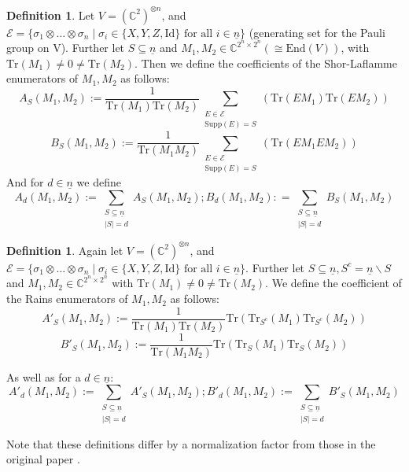 \documentclass[12pt,a4paper,BCOR15mm,twoside,DIV12]{article}
\def\C{\mathbb{C}}
\def\supp{\text{Supp}}
\def\n{\underline{n}}
\def\fa{\text{ for all }}
\def\Tr{\text{Tr}}
\def\Id{\text{Id}}
\theoremstyle{definition}
\newtheorem{defn}[Satz]{Definition}
\begin{document}
\begin{defn}\label{shorLaflamme}
Let $V = (\C^2)^{\otimes n}$, and $\mathcal{E} = \{ \sigma_1 \otimes \ldots \otimes \sigma_n \mid \sigma_i \in \{X,Y,Z,\Id \} \fa i \in \underline{n} \}$ (generating set for the Pauli group on V). Further let $S \subseteq \underline{n}$ and $M_1, M_2 \in \C^{2^n \times 2^n} (\cong \text{End}(V))$, with $\Tr(M_1) \neq 0 \neq \Tr(M_2)$.
Then we define the coefficients of the Shor-Laflamme enumerators \cite{shor-Laflamme} of $M_1, M_2$ as follows:
\begin{equation} A_S(M_1,M_2) := \frac{1}{\Tr(M_1)\Tr(M_2)}\sum_{\substack{E \in \mathcal{E} \\ \supp(E) = S}}(\Tr(E M_1)\Tr(E M_2)) \end{equation}
\begin{equation} B_S(M_1,M_2) := \frac{1}{\Tr(M_1 M_2)} \sum_{\substack{E \in \mathcal{E} \\ \supp(E) = S}}(\Tr(E M_1 E M_2)) \end{equation}
And for $d \in \underline{n}$ we define
\begin{equation} A_d(M_1,M_2) := \sum_{\substack{ S \subseteq \underline{n} \\ |S| = d}} A_S(M_1,M_2) ; B_d(M_1,M_2): = \sum_{\substack{ S \subseteq \underline{n} \\ |S| = d}} B_S(M_1,M_2) \end{equation}
\end{defn}


\begin{defn}\label{rains}
Again let $V = (\C^2)^{\otimes n}$, and $\mathcal{E} = \{ \sigma_1 \otimes \ldots \otimes \sigma_n \mid \sigma_i \in \{X,Y,Z,\Id \} \fa i \in \underline{n} \}$. Further let $S \subseteq \underline{n}, S^c = \n \backslash S$ and $M_1, M_2 \in \C^{2^n \times 2^n}$ with $\Tr(M_1) \neq 0 \neq \Tr(M_2)$.
We define the coefficient of the Rains enumerators \cite{rains} of $M_1,M_2$ as follows:
\begin{equation}A'_S(M_1,M_2) := \frac{1}{\Tr(M_1)\Tr(M_2)} \Tr(\Tr_{S^c}(M_1)\Tr_{S^c}(M_2)) \end{equation}
\begin{equation}B'_S(M_1,M_2) := \frac{1}{\Tr(M_1 M_2)} \Tr(\Tr_S(M_1)\Tr_S(M_2)) \end{equation}

As well as for a $d \in \n$: 
\begin{equation} A'_d(M_1,M_2) := \sum_{\substack{ S \subseteq \underline{n} \\ |S| = d}} A'_S(M_1,M_2) ; B'_d(M_1,M_2) := \sum_{\substack{ S \subseteq \underline{n} \\ |S| = d}} B'_S(M_1,M_2) \end{equation}
\end{defn}
Note that these definitions differ by a normalization factor from those in the original paper \cite{rains}.
\end{document}
